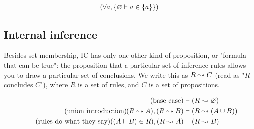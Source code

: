 \documentclass{article}
\begin{document}
  \begin{align*}
    (\forall a, \{\varnothing \vdash a \in \{a\}\})\\
  \end{align*}
  
  \iffalse
  We also define some equivalences of infinite sets. Here are two rules, each stated in two different ways (with combinators, and with named arguments):
  \begin{align*}
    &\vdash A \equals \all (\const A) & &\vdash A \equals (\forall b, A) \\
    &\vdash (\all A) \equals \all (\fuse (\const \atomall) A) & &\vdash (\forall b, Ab) \equals (\forall b, \forall c, A(bc))\\
  \end{align*}
  \fi
  
  
  
  \subsection{Internal inference}
  
  Besides set membership, IC has only one other kind of proposition, or "formula that can be true": the proposition that a particular set of inference rules allows you to draw a particular set of conclusions.
  We write this as $R \leadsto C$ (read as "$R$ concludes $C$"), where $R$ is a set of rules, and $C$ is a set of propositions.

  \begin{align*}
    \tag{base case}
    &\vdash (R \leadsto \varnothing) \\
    \tag{union introduction}
    (R \leadsto A), (R \leadsto B) &\vdash (R \leadsto (A \cup B)) \\
    \tag{rules do what they say}
    ((A \vdash B) \in R), (R \leadsto A) &\vdash (R \leadsto B) \\
  \end{align*}
  
\end{document}
